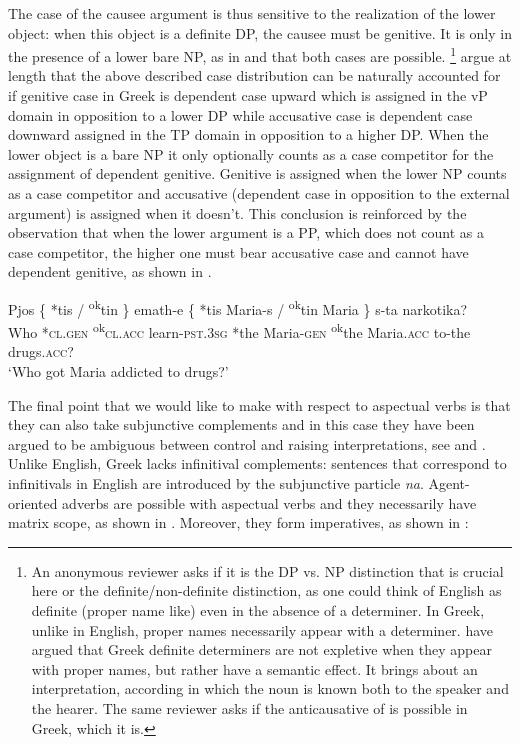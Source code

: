 \documentclass[output=paper]{langscibook}
\begin{document}
\largerpage[2]
The case of the causee argument is thus sensitive to the realization of the lower object: 
when this object is a definite DP, the causee must be genitive.
It is only in the presence of a lower bare NP, as in  and   that both cases are possible.%
\footnote{
    \label{alexiadouftn:key:6}
    An anonymous reviewer asks if it is the DP vs. NP distinction that is crucial here or the definite/non-definite distinction, 
    as one could think of English as definite (proper name like) even in the absence of a determiner. 
    In Greek, unlike in English, proper names necessarily appear with a determiner. 
    \citet{AlexopoulouFolli2011,AlexopoulouFolli2019} have argued that Greek definite determiners are not expletive when they appear with proper names, 
    but rather have a semantic effect. 
    It brings about an interpretation, according in which the noun is known both  to the speaker and the hearer. 
    The same reviewer asks if the anticausative of  is possible in Greek, which it is.
}
\citet{AnagnostopoulouSevdali2020} argue at length that the above described case distribution can be naturally accounted for 
if genitive case in Greek is dependent case upward which is assigned in the vP domain in opposition to a lower DP 
while accusative case is dependent case downward assigned in the TP domain in opposition to a higher DP.  
When the lower object is a bare NP it only optionally counts as a case competitor for the assignment of dependent genitive. 
Genitive is assigned when the lower NP counts as a case competitor 
and accusative (dependent case in opposition to the external argument) is assigned when it doesn’t. 
This conclusion is reinforced by the observation that when the lower argument is a PP, which does not count as a case competitor, 
the higher one must bear accusative case and cannot have dependent genitive, as shown in .

\ea%
    \label{alexiadouex:key:11}
    \gll Pjos \{ *tis / \textsuperscript{ok}tin \}  emath-e \{ *tis Maria-s / \textsuperscript{ok}tin Maria \} s-ta  narkotika?\\
    Who {} *\textsc{cl.gen} {} \textsuperscript{ok}\textsc{cl.acc} {} learn-\textsc{pst.3sg} {} *the Maria-\textsc{gen} {} \textsuperscript{ok}the Maria.\textsc{acc} {} to-the drugs.\textsc{acc}? \\
    \glt ‘Who got Maria addicted to drugs?’
\z 

The final point that we would like to make with respect to aspectual verbs is that 
they can also take subjunctive complements and in this case they have been argued to be ambiguous between control and raising interpretations, 
see \citet{alexiadouanagnostopoulou1999} and \citet{Roussou2009}. 
Unlike English, Greek lacks infinitival complements: 
sentences that correspond to infinitivals in English are introduced by the subjunctive particle \textit{na}. 
Agent-oriented adverbs are possible with aspectual verbs and they necessarily have matrix scope, as shown in . 
Moreover, they form imperatives, as shown in :
\end{document}
